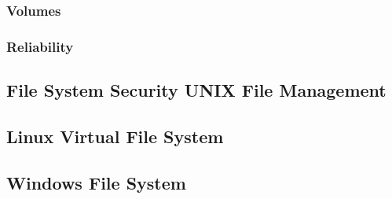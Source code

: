 \subsubsection{Volumes}

\subsubsection{Reliability}

\subsection{File System Security UNIX File Management}

\subsection{Linux Virtual File System }
\subsection{Windows File System}

\biblio

